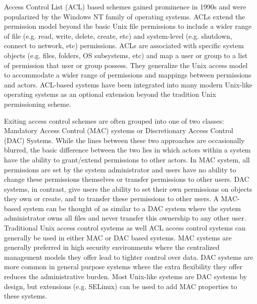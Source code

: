 Access Control List (ACL) based schemes gained prominence in 1990s and
were popularized by the Windows NT family of operating systems. ACLs
extend the permission model beyond the basic Unix file permissions to
include a wider range of file (e.g. read, write, delete, create, etc)
and system-level (e.g. shutdown, connect to network, etc)
permissions. ACLs are associated with specific system objects
(e.g. files, folders, OS subsystems, etc) and map a user or group to a
list of permission that user or group possess. They generalize the
Unix access model to accommodate a wider range of permissions and
mappings between permissions and actors. ACL-based systems have been
integrated into many modern Unix-like operating systems as an optional
extension beyond the tradition Unix permissioning scheme.

Exiting access control schemes are often grouped into one of two
classes: Mandatory Access Control (MAC) systems or Discretionary
Access Control (DAC) Systems. While the lines between these two
approaches are occasionally blurred, the basic difference between the
two lies in which actors within a system have the ability to
grant/extend permissions to other actors. In MAC system, all
permissions are set by the system administrator and users have no
ability to change these permissions themselves or transfer permissions
to other users. DAC systems, in contrast, give users the ability to
set their own permissions on objects they own or create, and to
transfer these permissions to other users. A MAC-based system can be
thought of as similar to a DAC system where the system administrator
owns all files and never transfer this ownership to any other
user. Traditional Unix access control systems as well ACL access
control systems can generally be used in either MAC or DAC based
systems. MAC systems are generally preferred in high security
environments where the centralized management models they offer lead
to tighter control over data. DAC systems are more common in general
purpose systems where the extra flexibility they offer reduces the
administrative burden. Most Unix-like systems are DAC systems by
design, but extensions (e.g. SELinux) can be used to add MAC
properties to these systems.

